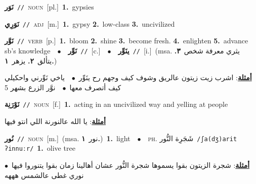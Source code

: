 \documentclass[10pt,a4paper,twoside]{article} %
\begin{document}
\begin{multicols}{2}
{\setlength\topsep{0pt}\textbf{\foreignlanguage{arabic}{نَوَر}}\ {\color{gray}\texttt{//}\color{black}}\ \textsc{noun}\ [pl.]\ \textbf{1.}~gypsies\ } \vspace{2mm}

{\setlength\topsep{0pt}\textbf{\foreignlanguage{arabic}{نَوَرِي}}\ {\color{gray}\texttt{//}\color{black}}\ \textsc{adj}\ [m.]\ \textbf{1.}~gypsy  \textbf{2.}~low-class  \textbf{3.}~uncivilized\ } \vspace{2mm}

{\setlength\topsep{0pt}\textbf{\foreignlanguage{arabic}{نَوَّر}}\ {\color{gray}\texttt{//}\color{black}}\ \textsc{verb}\ [p.]\ \textbf{1.}~bloom  \textbf{2.}~shine  \textbf{3.}~become fresh.  \textbf{4.}~enlighten  \textbf{5.}~advance sb's knowledge\ \ $\bullet$\ \ \setlength\topsep{0pt}\textbf{\foreignlanguage{arabic}{نَوِّر}}\ {\color{gray}\texttt{//}\color{black}}\ [c.]\ \ $\bullet$\ \ \setlength\topsep{0pt}\textbf{\foreignlanguage{arabic}{ينَوِّر}}\ {\color{gray}\texttt{//}\color{black}}\ [i.]\ \color{gray}(msa. \foreignlanguage{arabic}{يثري معرفة شخص}~\foreignlanguage{arabic}{\textbf{٣.}}  \foreignlanguage{arabic}{يتألق}~\foreignlanguage{arabic}{\textbf{٢.}}  \foreignlanguage{arabic}{يزهر}~\foreignlanguage{arabic}{\textbf{١.}})\color{black}\  \begin{flushright}\color{gray}\foreignlanguage{arabic}{\textbf{\underline{\foreignlanguage{arabic}{أمثلة}}}: اشرب زيت زيتون عالريق وشوف كيف وجهم رح ينَوِّر\ $\bullet$\ \  ياخي نَوِّرني واحكيلي كيف أتصرف معها\ $\bullet$\ \  نوَّر الزرع بشهر 5}\end{flushright}\color{black}} \vspace{2mm}

{\setlength\topsep{0pt}\textbf{\foreignlanguage{arabic}{نَوْرَنِة}}\ {\color{gray}\texttt{//}\color{black}}\ \textsc{noun}\ [f.]\ \textbf{1.}~acting in an uncivilized way and yelling at people\  \begin{flushright}\color{gray}\foreignlanguage{arabic}{\textbf{\underline{\foreignlanguage{arabic}{أمثلة}}}: يا الله عالنورنة اللي انتو فيها}\end{flushright}\color{black}} \vspace{2mm}

{\setlength\topsep{0pt}\textbf{\foreignlanguage{arabic}{نُور}}\ {\color{gray}\texttt{//}\color{black}}\ \textsc{noun}\ [m.]\ \color{gray}(msa. \foreignlanguage{arabic}{نور}~\foreignlanguage{arabic}{\textbf{١.}})\color{black}\ \textbf{1.}~light\ \ $\bullet$\ \ \textsc{ph.} \color{gray} \foreignlanguage{arabic}{شَجَرِة النُّور}\color{black}\ {\color{gray}\texttt{/{\sffamily ʃa(dʒ)arit ʔinnuːr}/}\color{black}}\ \textbf{1.}~olive tree\  \begin{flushright}\color{gray}\foreignlanguage{arabic}{\textbf{\underline{\foreignlanguage{arabic}{أمثلة}}}: شجرة الزيتون بقوا يسموها شجرة النُّور عشان أهالينا زمان بقوا يتنوروا فيها\ $\bullet$\ \  نوري غطى عالشمس هههه}\end{flushright}\color{black}} \vspace{2mm}


\end{multicols}
\end{document}
